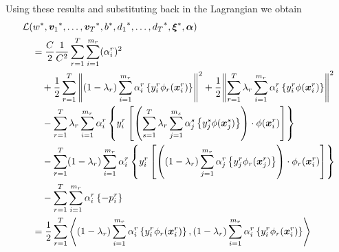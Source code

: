 
Using these results and substituting back in the Lagrangian we obtain
\begin{equation}\nonumber
    \begin{aligned}
         &\lagr(\optim{{w}}, \optim{\fv{v}_1}, \ldots, \optim{\fv{v}_\ntasks}, \optim{b}, \optim{d_1}, \ldots, \optim{d_\ntasks}, \optim{\fv{\xi}}, \fv{\alpha}) \\
        &\quad= \frac{C}{2} \frac{1}{C^2} \sum_{r=1}^\ntasks \sum_{i=1}^{\npertask_r} (\alpha_i^r)^2 \\
        &\qquad +  \frac{1}{2} \sum_{r= 1}^T{\norm{ (1 - \lambda_r) \sum_{i=1}^{m_r}  {\alpha_i^r} \left\lbrace y_i^r \phi_r(\fv{x}_i^r) \right\rbrace}^2} + \frac{1}{2} {\norm{\sum_{r= 1}^T \lambda_r \sum_{i=1}^{m_r} {\alpha_i^r} \left\lbrace y_i^r \phi(\fv{x}_i^r) \right\rbrace}}^2 \\
        &\qquad - \sum_{r= 1}^T \lambda_r \sum_{i=1}^{m_r} \alpha_i^r \left\lbrace y_{i}^r \left[ \left(\sum_{s= 1}^T \lambda_r \sum_{j=1}^{m_s} {\alpha_j^s} \left\lbrace y_j^s \phi(\fv{x}_j^s) \right\rbrace \right) \cdot \phi(\fv{x}_{i}^r) \right]  \right\rbrace \\
        &\qquad -  \sum_{r= 1}^T (1-\lambda_r) \sum_{i=1}^{m_r} \alpha_i^r \left\lbrace y_{i}^r \left[  \left((1-\lambda_r) \sum_{j=1}^{m_r} {\alpha_j^r} \left\lbrace y_j^r \phi_r(\fv{x}_j^r) \right\rbrace \right) \cdot \phi_r(\fv{x}_{i}^r)  \right]  \right\rbrace \\
        &\qquad -  \sum_{r= 1}^T \sum_{i=1}^{m_r} \alpha_i^r \left\lbrace - p_{i}^r  \right\rbrace \\
        &\quad=  \frac{1}{2} \sum_{r= 1}^T{\dotp{(1-\lambda_r)\sum_{i=1}^{m_r} {\alpha_i^r} \left\lbrace y_i^r \phi_r(\fv{x}_i^r) \right\rbrace}{(1-\lambda_r)\sum_{i=1}^{m_r} {\alpha_i^r} \left\lbrace y_i^r \phi_r(\fv{x}_i^r) \right\rbrace}} \\

\end{aligned}
\end{equation}
